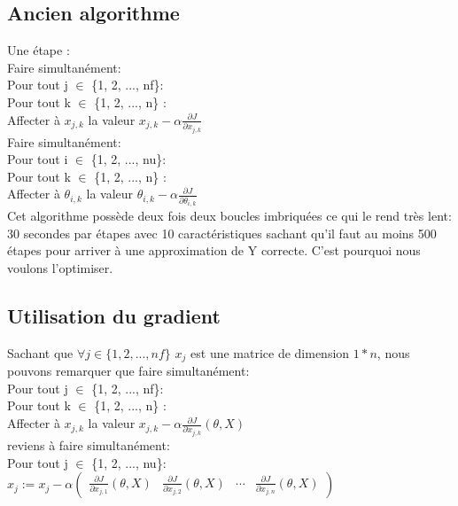 \documentclass[a4paper,10pt]{article}
\begin{document}
\subsection{Ancien algorithme}

\noindent Une \'{e}tape :\\
\indent Faire simultan\'{e}ment:\\
\indent \indent Pour tout j $\in$ \{1, 2, ..., nf\}:\\
\indent \indent \indent Pour tout k $\in$ \{1, 2, ..., n\} :\\
\indent \indent \indent \indent Affecter \`{a} $x_{j,k}$ la valeur $x_{j,k}-\alpha\frac{\partial J}{\partial x_{j,k}}$\\
\indent Faire simultan\'{e}ment:\\
\indent \indent Pour tout i $\in$ \{1, 2, ..., nu\}:\\
\indent \indent \indent Pour tout k $\in$ \{1, 2, ..., n\} :\\
\indent \indent \indent \indent Affecter \`{a} $\theta_{i,k}$ la valeur $\theta_{i,k}-\alpha\frac{\partial J}{\partial \theta_{i,k}}$\\

\noindent Cet algorithme poss\`{e}de deux fois deux boucles imbriqu\'{e}es ce qui le rend tr\`es lent: 30 secondes par \'{e}tapes avec 10 caract\'{e}ristiques sachant qu'il faut au moins 500 \'{e}tapes pour arriver à une approximation de Y correcte. C'est pourquoi nous voulons l'optimiser.

\subsection{Utilisation du gradient}

Sachant que $\forall j \in \{1, 2, ..., nf\}$ $x_{j}$ est une matrice de dimension $1 * n$, nous pouvons remarquer que faire simultan\'{e}ment:\\

\noindent Pour tout j $\in$ \{1, 2, ..., nf\}:\\
\indent Pour tout k $\in$ \{1, 2, ..., n\} :\\
\indent \indent Affecter \`{a} $x_{j,k}$ la valeur $x_{j,k}-\alpha\frac{\partial J}{\partial x_{j,k}}(\theta, X)$\\

\noindent reviens \`{a} faire simultan\'{e}ment:\\

\noindent Pour tout j $\in$ \{1, 2, ..., nu\}:\\
\indent $x_{j} := x_{j}-\alpha
\begin{pmatrix}
\frac{\partial J}{\partial x_{j,1}}(\theta, X) & \frac{\partial J}{\partial x_{j,2}}(\theta, X) & \cdots & \frac{\partial J}{\partial x_{j,n}}(\theta, X)
\end{pmatrix}$\\
\end{document}
